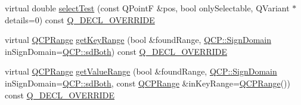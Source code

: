 \begin{DoxyCompactItemize}
\item 
virtual double \hyperlink{class_q_c_p_statistical_box_a1607fa92f829c631107c20ccb2d70a6d}{select\+Test} (const Q\+PointF \&pos, bool only\+Selectable, Q\+Variant $\ast$details=0) const \hyperlink{qcustomplot_8hh_a42cc5eaeb25b85f8b52d2a4b94c56f55}{Q\+\_\+\+D\+E\+C\+L\+\_\+\+O\+V\+E\+R\+R\+I\+DE}
\item 
virtual \hyperlink{class_q_c_p_range}{Q\+C\+P\+Range} \hyperlink{class_q_c_p_statistical_box_a77d2d13301dfe60c13adfaa17fc1802f}{get\+Key\+Range} (bool \&found\+Range, \hyperlink{namespace_q_c_p_afd50e7cf431af385614987d8553ff8a9}{Q\+C\+P\+::\+Sign\+Domain} in\+Sign\+Domain=\hyperlink{namespace_q_c_p_afd50e7cf431af385614987d8553ff8a9aa38352ef02d51ddfa4399d9551566e24}{Q\+C\+P\+::sd\+Both}) const \hyperlink{qcustomplot_8hh_a42cc5eaeb25b85f8b52d2a4b94c56f55}{Q\+\_\+\+D\+E\+C\+L\+\_\+\+O\+V\+E\+R\+R\+I\+DE}
\item 
virtual \hyperlink{class_q_c_p_range}{Q\+C\+P\+Range} \hyperlink{class_q_c_p_statistical_box_ab3388a21d0c2e86fbc0cba9c06ceb49b}{get\+Value\+Range} (bool \&found\+Range, \hyperlink{namespace_q_c_p_afd50e7cf431af385614987d8553ff8a9}{Q\+C\+P\+::\+Sign\+Domain} in\+Sign\+Domain=\hyperlink{namespace_q_c_p_afd50e7cf431af385614987d8553ff8a9aa38352ef02d51ddfa4399d9551566e24}{Q\+C\+P\+::sd\+Both}, const \hyperlink{class_q_c_p_range}{Q\+C\+P\+Range} \&in\+Key\+Range=\hyperlink{class_q_c_p_range}{Q\+C\+P\+Range}()) const \hyperlink{qcustomplot_8hh_a42cc5eaeb25b85f8b52d2a4b94c56f55}{Q\+\_\+\+D\+E\+C\+L\+\_\+\+O\+V\+E\+R\+R\+I\+DE}
\end{DoxyCompactItemize}
